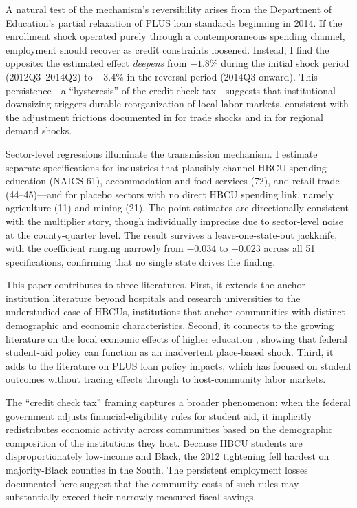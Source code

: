 \documentclass[12pt]{article}
\begin{document}
A natural test of the mechanism's reversibility arises from the Department of Education's partial relaxation of PLUS loan standards beginning in 2014. If the enrollment shock operated purely through a contemporaneous spending channel, employment should recover as credit constraints loosened. Instead, I find the opposite: the estimated effect \emph{deepens} from $-1.8\%$ during the initial shock period (2012Q3--2014Q2) to $-3.4\%$ in the reversal period (2014Q3 onward). This persistence---a ``hysteresis'' of the credit check tax---suggests that institutional downsizing triggers durable reorganization of local labor markets, consistent with the adjustment frictions documented in \citet{autor2013} for trade shocks and in \citet{blanchard1992} for regional demand shocks.

Sector-level regressions illuminate the transmission mechanism. I estimate separate specifications for industries that plausibly channel HBCU spending---education (NAICS 61), accommodation and food services (72), and retail trade (44--45)---and for placebo sectors with no direct HBCU spending link, namely agriculture (11) and mining (21). The point estimates are directionally consistent with the multiplier story, though individually imprecise due to sector-level noise at the county-quarter level. The result survives a leave-one-state-out jackknife, with the coefficient ranging narrowly from $-0.034$ to $-0.023$ across all 51 specifications, confirming that no single state drives the finding.

This paper contributes to three literatures. First, it extends the anchor-institution literature beyond hospitals and research universities \citep{harkavy2000,ehlenz2018} to the understudied case of HBCUs, institutions that anchor communities with distinct demographic and economic characteristics. Second, it connects to the growing literature on the local economic effects of higher education \citep{cellini2009,deming2012,bound2007}, showing that federal student-aid policy can function as an inadvertent place-based shock. Third, it adds to the literature on PLUS loan policy impacts, which has focused on student outcomes \citep{johnson2015,hardy2019,darolia2020} without tracing effects through to host-community labor markets.

The ``credit check tax'' framing captures a broader phenomenon: when the federal government adjusts financial-eligibility rules for student aid, it implicitly redistributes economic activity across communities based on the demographic composition of the institutions they host. Because HBCU students are disproportionately low-income and Black, the 2012 tightening fell hardest on majority-Black counties in the South. The persistent employment losses documented here suggest that the community costs of such rules may substantially exceed their narrowly measured fiscal savings.
\end{document}
